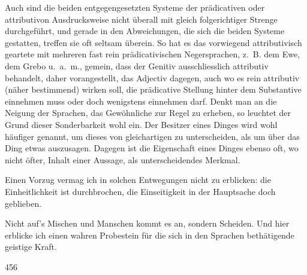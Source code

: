 Auch sind die beiden entgegengesetzten Systeme der prädicativen oder attributivon Ausdrucksweise nicht überall mit gleich folgerichtiger Strenge durchgeführt, und gerade in den Abweichungen, die sich die beiden Systeme gestatten, treffen sie oft seltsam überein. So hat es das vorwiegend attributivisch geartete   mit mehreren fast rein prädicativischen Negersprachen, z.~B. dem Ewe, dem Grebo u.~a.~m., gemein, dass der Genitiv ausschliesslich attributiv behandelt, daher vorangestellt, das Adjectiv dagegen, auch wo es rein attributiv (näher bestimmend) wirken soll, die prädicative Stellung hinter dem Substantive einnehmen muss oder doch wenigstens einnehmen darf. Denkt man an die Neigung der Sprachen, das Gewöhnliche zur Regel zu erheben, so leuchtet der Grund dieser Sonderbarkeit wohl ein. Der Besitzer eines Dinges wird wohl häufiger genannt, um dieses von  gleichartigen zu unterscheiden, als um über das Ding etwas auszusagen. Dagegen ist die Eigenschaft eines Dinges ebenso oft, wo nicht öfter, Inhalt einer Aussage, als unterscheidendes Merkmal.

Einen Vorzug vermag ich in solchen Entwegungen nicht zu erblicken: die Einheitlichkeit ist durchbrochen, die Einseitigkeit in der Hauptsache doch geblieben.

Nicht auf’s Mischen und Manschen kommt es an, sondern  Scheiden. Und hier erblicke ich einen wahren Probestein für die sich in den Sprachen bethätigende geistige Kraft. 


{\textbar}{\textbar}456{\textbar}{\textbar}\label{sp.456}

